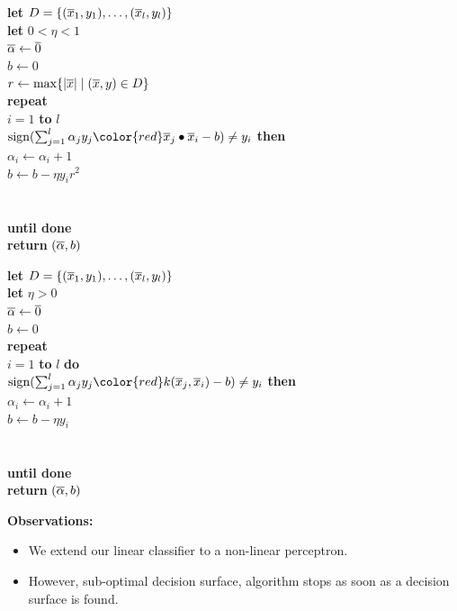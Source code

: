 \documentclass[a4paper,blends,pdf,colorBG,slideColor]{prosper}
\begin{document}
\begin{minipage}{2.1in}
\scriptsize
{\bf let} $D = \{(\overline{x}_1,y_1), \dots,(\overline{x}_l,y_l)\} $\\
{\bf let} $0 < \eta <1$\\
$\overline{\alpha} \leftarrow \overline{0}$\\
$b \leftarrow 0$\\
$r \leftarrow \max \{ |{\overline{x}}| \mid (\overline{x},y)\in D\}$\\
{\bf repeat}\\
 $i = 1$ {\bf to} $l$\\
\mytab{} $\sign(\sum_{j=1}^l \alpha_j y_j {\color{red}\ol{x}_j\bullet\ol{x}_i} - b) \neq y_i$ {\bf then}\\
\mytab\mytab\mytab $\alpha_i \leftarrow \alpha_i + 1$\\
\mytab\mytab\mytab $b \leftarrow b - \eta y_i r^2$\\
\mytab{}\\
\\
{\bf until done} \\
{\bf return} $(\overline{\alpha}, b)$
\end{minipage}
\begin{minipage}{2in}
\scriptsize
{\bf let} $D = \{(\overline{x}_1,y_1),\dots,(\overline{x}_l,y_l)\} $\\
{\bf let} $\eta > 0$\\
$\overline{\alpha} \leftarrow \overline{0}$\\
$b \leftarrow 0$\\
{\bf repeat}\\
 $i = 1$ {\bf to} $l$ {\bf do}\\
\mytab{} $\sign(\sum_{j=1}^l \alpha_j y_j {\color{red}k(\ol{x}_j,\ol{x}_i)} - b) \neq y_i$ {\bf then}\\
\mytab\mytab\mytab $\alpha_i \leftarrow \alpha_i + 1$\\
\mytab\mytab\mytab $b \leftarrow b - \eta y_i$\\
\mytab{}\\
\\
{\bf until done} \\
{\bf return} $(\overline{\alpha}, b)$
\end{minipage}

\vspace{.2in}
\small
{\bf Observations:}
\begin{itemize}
\item We extend our linear classifier to a non-linear perceptron.
\item However, sub-optimal decision surface, algorithm stops as soon as a decision surface is found.
\end{itemize}
\es
\end{document}
